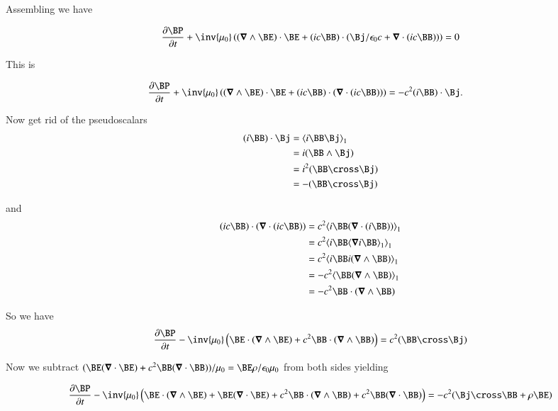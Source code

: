 Assembling we have

\begin{align*}
\PD{t}{\BP} + \inv{\mu_0} \left( (\spacegrad \wedge \BE) \cdot \BE + (i c\BB) \cdot ( \Bj/\epsilon_0 c + \spacegrad \cdot (ic \BB) ) \right) &= 0 \\
\end{align*}

This is

\begin{align*}
\PD{t}{\BP} + \inv{\mu_0} \left( (\spacegrad \wedge \BE) \cdot \BE + (i c\BB) \cdot ( \spacegrad \cdot (ic \BB) ) \right) &= -c^2 (i \BB) \cdot \Bj.
\end{align*}

Now get rid of the pseudoscalars
\begin{align*}
(i \BB) \cdot \Bj
&= \gpgradeone{ i \BB \Bj } \\
&= i (\BB \wedge \Bj) \\
&= i^2 (\BB \cross \Bj) \\
&= -(\BB \cross \Bj) \\
\end{align*}

and 
\begin{align*}
(i c\BB) \cdot ( \spacegrad \cdot (ic \BB) )  
&= c^2 \gpgradeone{ i \BB ( \spacegrad \cdot (i\BB) ) } \\
&= c^2 \gpgradeone{ i \BB \gpgradeone{\spacegrad i\BB} } \\
&= c^2 \gpgradeone{ i \BB i (\spacegrad \wedge \BB) } \\
&= -c^2 \gpgradeone{ \BB (\spacegrad \wedge \BB) } \\
&= -c^2 \BB \cdot (\spacegrad \wedge \BB) \\
\end{align*}

So we have
\begin{align*}
\PD{t}{\BP} - \inv{\mu_0} \left( \BE \cdot (\spacegrad \wedge \BE) +c^2 \BB \cdot (\spacegrad \wedge \BB) \right) &= c^2 (\BB \cross \Bj) \\
\end{align*}

Now we subtract $(\BE (\spacegrad \cdot \BE) + c^2 \BB (\spacegrad \cdot \BB))/\mu_0 = \BE \rho/\epsilon_0\mu_0$ from both sides yielding

\begin{align*}
\PD{t}{\BP} - \inv{\mu_0} \left( 
\BE \cdot (\spacegrad \wedge \BE) + \BE (\spacegrad \cdot \BE) 
+ c^2 \BB \cdot (\spacegrad \wedge \BB) 
+ c^2 \BB (\spacegrad \cdot \BB)
\right) &= -c^2 (\Bj \cross \BB + \rho \BE) \\
\end{align*}

